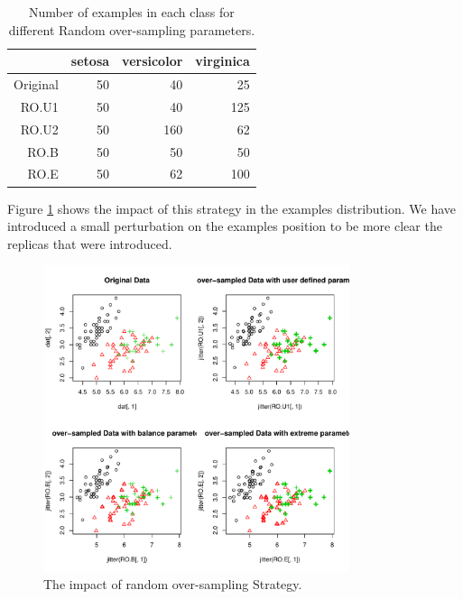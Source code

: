 \documentclass[10pt,a4paper]{article}\usepackage[]{graphicx}\usepackage[]{color}
\newenvironment{knitrout}{}{} %
\begin{document}
\begin{table}[ht]
\centering
\begin{tabular}{rrrr}
  \hline
 & setosa & versicolor & virginica \\ 
  \hline
Original &  50 &  40 &  25 \\ 
  RO.U1 &  50 &  40 & 125 \\ 
  RO.U2 &  50 & 160 &  62 \\ 
  RO.B &  50 &  50 &  50 \\ 
  RO.E &  50 &  62 & 100 \\ 
   \hline
\end{tabular}
\caption{Number of examples in each class for different Random over-sampling parameters.} 
\label{tab:RO_tab}
\end{table}


Figure \ref{fig:IrisRO} shows the impact of this strategy in the examples distribution. We have introduced a small perturbation on the examples position to be more clear the replicas that were introduced.

\begin{knitrout}\footnotesize
{}\color{fgcolor}\begin{figure}

{\centering \includegraphics[width=0.8\textwidth]{figures/UBL-IrisRO-1} 

}

\caption[The impact of random over-sampling Strategy]{The impact of random over-sampling Strategy.}\label{fig:IrisRO}
\end{figure}


\end{knitrout}
\end{document}
